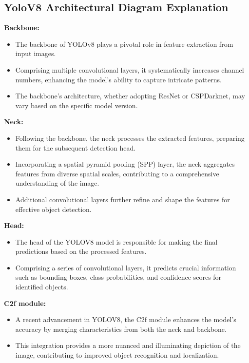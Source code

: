 \documentclass[12 pt]{report}
\begin{document}
\subsection{YoloV8 Architectural Diagram Explanation}
{
  \begin{justify}
    \item \textbf{Backbone:}
    \begin{itemize}
        \item The backbone of YOLOv8 plays a pivotal role in feature extraction from input images.
        \item Comprising multiple convolutional layers, it systematically increases channel numbers, enhancing the model's ability to capture intricate patterns.
        \item The backbone's architecture, whether adopting ResNet or CSPDarknet, may vary based on the specific model version.
    \end{itemize}

\item \textbf{Neck:}
    \begin{itemize}
        \item Following the backbone, the neck processes the extracted features, preparing them for the subsequent detection head.
        \item Incorporating a spatial pyramid pooling (SPP) layer, the neck aggregates features from diverse spatial scales, contributing to a comprehensive understanding of the image.
        \item Additional convolutional layers further refine and shape the features for effective object detection.
    \end{itemize}

\item \textbf{Head:}
    \begin{itemize}
        \item The head of the YOLOV8 model is responsible for making the final predictions based on the processed features.
        \item Comprising a series of convolutional layers, it predicts crucial information such as bounding boxes, class probabilities, and confidence scores for identified objects.
    \end{itemize}

\item \textbf{C2f module:}
    \begin{itemize}
        \item A recent advancement in YOLOV8, the C2f module enhances the model's accuracy by merging characteristics from both the neck and backbone.
        \item This integration provides a more nuanced and illuminating depiction of the image, contributing to improved object recognition and localization.
    \end{itemize}


\end{justify}}
\end{document}
